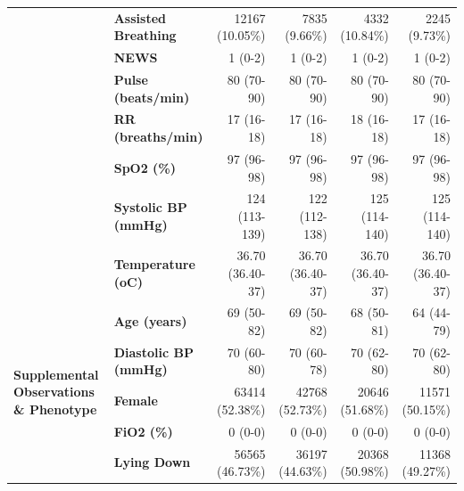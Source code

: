 \documentclass[fleqn,10pt]{wlscirep}
\begin{document}
\begin{table}[htbp]
\begin{tabular}{llrrrr}
                                                                           & \textbf{Assisted Breathing}    & 12167 (10.05\%)   & 7835 (9.66\%)     & 4332 (10.84\%)   & 2245 (9.73\%)    \\
                                                                           & \textbf{NEWS}                  & 1 (0-2)           & 1 (0-2)           & 1 (0-2)          & 1 (0-2)          \\
                                                                           & \textbf{Pulse (beats/min)}     & 80 (70-90)        & 80 (70-90)        & 80 (70-90)       & 80 (70-90)       \\
                                                                           & \textbf{RR (breaths/min)}      & 17 (16-18)        & 17 (16-18)        & 18 (16-18)       & 17 (16-18)       \\
                                                                           & \textbf{SpO2 (\%)}             & 97 (96-98)        & 97 (96-98)        & 97 (96-98)       & 97 (96-98)       \\
                                                                           & \textbf{Systolic BP (mmHg)}    & 124 (113-139)     & 122 (112-138)     & 125 (114-140)    & 125 (114-140)    \\
                                                                           & \textbf{Temperature (oC)}      & 36.70 (36.40-37)  & 36.70 (36.40-37)  & 36.70 (36.40-37) & 36.70 (36.40-37) \\
        \cline{1-6}
        \multirow{8}{2cm}{\textbf{Supplemental Observations \& Phenotype}} & \textbf{Age (years)}           & 69 (50-82)        & 69 (50-82)        & 68 (50-81)       & 64 (44-79)       \\
                                                                           & \textbf{Diastolic BP (mmHg)}   & 70 (60-80)        & 70 (60-78)        & 70 (62-80)       & 70 (62-80)       \\
                                                                           & \textbf{Female}                & 63414 (52.38\%)   & 42768 (52.73\%)   & 20646 (51.68\%)  & 11571 (50.15\%)  \\
                                                                           & \textbf{FiO2 (\%)}             & 0 (0-0)           & 0 (0-0)           & 0 (0-0)          & 0 (0-0)          \\
                                                                           & \textbf{Lying Down}            & 56565 (46.73\%)   & 36197 (44.63\%)   & 20368 (50.98\%)  & 11368 (49.27\%)  \\

\end{tabular}
\end{table}
\end{document}
